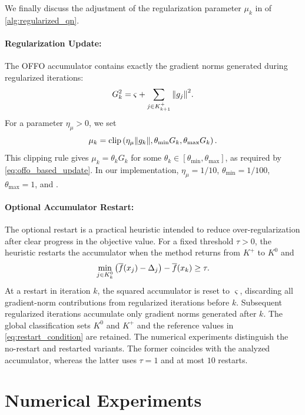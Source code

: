 \documentclass[journal_revised_MPC]{subfiles}
\begin{document}
We finally discuss the adjustment of the regularization parameter $\mu_k$ in  of \cref{alg:regularized_qn}.
\paragraph{Regularization Update: }

The OFFO accumulator contains exactly the gradient norms generated during regularized iterations:
\begin{equation*}
    G_k^2=\varsigma+\sum_{j\in K^+_{k+1}}\norm{g_j}^2.
\end{equation*}
For a parameter $\eta_\mu>0$, we set
\begin{equation*}
    \mu_k=\mathrm{clip}\left(\eta_\mu\norm{g_k},\theta_{\min}G_k,\theta_{\max}G_k\right).
\end{equation*}
This clipping rule gives $\mu_k=\theta_kG_k$ for some $\theta_k\in[\theta_{\min},\theta_{\max}]$, as required by \cref{eq:offo_based_update}.
In our implementation, $\eta_\mu=1/10$, $\theta_{\min}=1/100$, $\theta_{\max}=1$, and .

\paragraph{Optional Accumulator Restart: }

The optional restart is a practical heuristic intended to reduce over-regularization after clear progress in the objective value.
For a fixed threshold $\tau>0$, the heuristic restarts the accumulator when the method returns from $K^+$ to $K^0$ and
\begin{equation}\label{eq:restart_condition}
    \min_{j \in K_k^0} \qty(\overline{f}(x_j)-\Delta_j)-\overline{f}(x_k) \geq \tau.
\end{equation}
At a restart in iteration $k$, the squared accumulator is reset to $\varsigma$, discarding all gradient-norm contributions from regularized iterations before $k$.
Subsequent regularized iterations accumulate only gradient norms generated after $k$.
The global classification sets $K^0$ and $K^+$ and the reference values in \cref{eq:restart_condition} are retained.
The numerical experiments distinguish the no-restart and restarted variants.
The former coincides with the analyzed accumulator, whereas the latter uses $\tau=1$ and at most $10$ restarts.

\section{Numerical Experiments}\label{sec:experiments}
\end{document}
